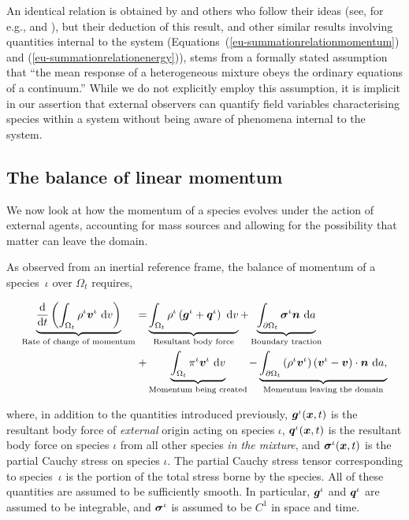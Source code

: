 An identical relation is obtained by \citet{TruesdellToupin:60} and
others who follow their ideas (see, for e.g., \citet{bowen76} and
\citet{passmanetal}), but their deduction of
this result, and other similar results involving quantities internal
to the system (Equations~(\ref{eu-summationrelationmomentum}) and
(\ref{eu-summationrelationenergy})), stems from a formally stated
assumption that ``the mean response of a heterogeneous mixture obeys
the ordinary equations of a continuum.'' While we do not explicitly
employ this assumption, it is implicit in our assertion that external
observers can quantify field variables characterising species within a
system without being aware of phenomena internal to the system.

\subsection{The balance of linear momentum}
\label{eu-balance-of-linear-momentum}

We now look at how the momentum of a species evolves under the action
of external agents, accounting for mass sources and allowing for the
possibility that matter can leave the domain.

As observed from an inertial reference frame, the balance of momentum
of a species~$\iota$ over $\Omega_{t}$ requires,

\begin{equation}
\begin{split}
\underbrace{\frac{\mathrm{d}}{\mathrm{d}t}\left(\int_{\Omega_{t}}
  \rho^{\iota} \mbox{\boldmath$ v$}^{\iota}\ \mathrm{d}v \right)}_{\text{Rate of change
    of momentum}} = & \underbrace{\int_{\Omega_{t}} \rho^{\iota}
  \left(\mbox{\boldmath$ g$}^{\iota} +
  \mbox{\boldmath$ q$}^{\iota}\right)\ \mathrm{d}v}_{\text{Resultant body force}} +
\underbrace{\int_{\partial \Omega_{t}}
  \mbox{\boldmath$\sigma$}^{\iota}\mbox{\boldmath$ n$}\ \mathrm{d}a}_{\text{Boundary traction}}\\ + &
\underbrace{\int_{\Omega_{t}}
  \pi^{\iota}\mbox{\boldmath$ v$}^{\iota}\ \mathrm{d}v}_{\text{Momentum being created}}
- \underbrace{\int_{\partial \Omega_{t}} \left(\rho^{\iota}
  \mbox{\boldmath$ v$}^{\iota} \right) \left(\mbox{\boldmath$ v$}^{\iota} - \mbox{\boldmath$ v$}\right) \cdot
  \mbox{\boldmath$ n$}\ \mathrm{d}a,}_{\text{Momentum leaving the domain}}
\end{split}
\label{eu-globalbalanceofmomentum}
\end{equation}

\noindent where, in addition to the quantities introduced previously,
$\mbox{\boldmath$ g$}^{\iota}(\mbox{\boldmath$ x$},t)$ is the resultant body force of {\em external}
origin acting on species $\iota$, $\mbox{\boldmath$ q$}^{\iota}(\mbox{\boldmath$ x$},t)$ is the
resultant body force on species $\iota$ from all other species {\em in
  the mixture}, and $\mbox{\boldmath$\sigma$}^{\iota}(\mbox{\boldmath$ x$},t)$ is the partial Cauchy
stress on species $\iota$. The partial Cauchy stress tensor
corresponding to species~$\iota$ is the portion of the total stress
borne by the species. All of these quantities are assumed to be
sufficiently smooth. In particular, $\mbox{\boldmath$ g$}^{\iota}$ and $\mbox{\boldmath$ q$}^{\iota}$
are assumed to be integrable, and $\mbox{\boldmath$\sigma$}^{\iota}$ is assumed to be
$\mathit{C}^{1}$ in space and time.

